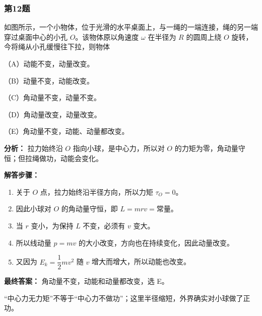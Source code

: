 \documentclass[12pt,a4paper]{ctexart}
\begin{document}
\subsubsection*{第12题}
\begin{tcolorbox}[colback=gray!2!white,colframe=black!60,title={题目}]
如图所示，一个小物体，位于光滑的水平桌面上，与一绳的一端连接，绳的另一端穿过桌面中心的小孔 \(O\)。该物体原以角速度 \(\omega\) 在半径为 \(R\) 的圆周上绕 \(O\) 旋转，今将绳从小孔缓慢往下拉，则物体\par
（A）动能不变，动量改变。\par
（B）动量不变，动能改变。\par
（C）角动量不变，动量不变。\par
（D）角动量改变，动量改变。\par
（E）角动量不变，动能、动量都改变。\par
\end{tcolorbox}
\begin{tcolorbox}[colback=blue!2!white,colframe=blue!55!black,title={完整答案}]
\textbf{分析：}
拉力始终沿 \(O\) 指向小球，是中心力，所以对 \(O\) 的力矩为零，角动量守恒；但拉绳做功，动能会变化。\par
\textbf{解答步骤：}
\begin{enumerate}
\item 关于 \(O\) 点，拉力始终沿半径方向，所以力矩 \(\tau_O=0\)。
\item 因此小球对 \(O\) 的角动量守恒，即 \(L=mrv=\text{常量}\)。
\item 当 \(r\) 变小，为保持 \(L\) 不变，必须有 \(v\) 变大。
\item 所以线动量 \(p=mv\) 的大小改变，方向也在持续变化，因此动量改变。
\item 又因为 \(E_k=\dfrac12 mv^2\) 随 \(v\) 增大而增大，所以动能也改变。
\end{enumerate}
\textbf{最终答案：}
角动量不变，动能和动量都改变，选 E。\par
\end{tcolorbox}
\begin{tcolorbox}[colback=red!2!white,colframe=red!55!black,title={易错点}]
“中心力无力矩”不等于“中心力不做功”；这里半径缩短，外界确实对小球做了正功。\par
\end{tcolorbox}
\end{document}
